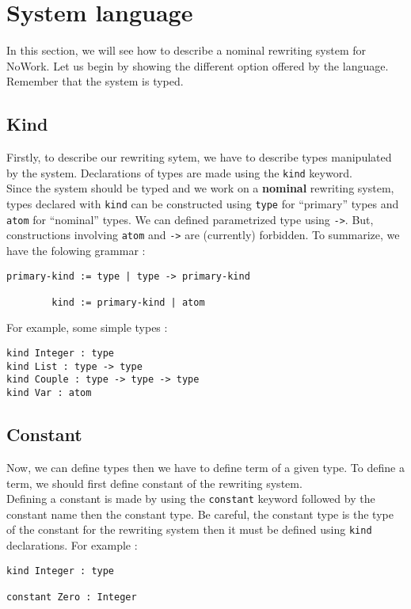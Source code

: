 \documentclass[12pt,a4paper]{article}
\begin{document}
\section{System language}
In this section, we will see how to describe a nominal rewriting
system for NoWork. Let us begin by showing the different option
offered by the language. Remember that the system is typed.


\subsection{Kind}
Firstly, to describe our rewriting sytem, we have to describe types
manipulated by the system. Declarations of types are made using the
\verb?kind? keyword.\\
Since the system should be typed and we work on a \textbf{nominal}
rewriting system, types declared with \verb?kind? can be constructed using
\verb?type? for ``primary'' types and \verb?atom? for ``nominal''
types. We can defined parametrized type using \verb?->?. But,
constructions involving \verb?atom? and \verb?->? are (currently) forbidden.
To summarize, we have the folowing grammar :
\begin{verbatim}
primary-kind := type | type -> primary-kind

        kind := primary-kind | atom
\end{verbatim}

For example, some simple types :
\begin{verbatim}
kind Integer : type
kind List : type -> type
kind Couple : type -> type -> type
kind Var : atom
\end{verbatim}


\subsection{Constant}
Now, we can define types then we have to define term of a given type.
To define a term, we should first define constant of the rewriting
system.\\
Defining a constant is made by using the \verb?constant? keyword followed
by the constant name then the constant type. Be careful, the constant
type is the type of the constant for the rewriting system then it must
be defined using \verb?kind? declarations. For example :

\begin{verbatim}
kind Integer : type

constant Zero : Integer
\end{verbatim}
\end{document}
